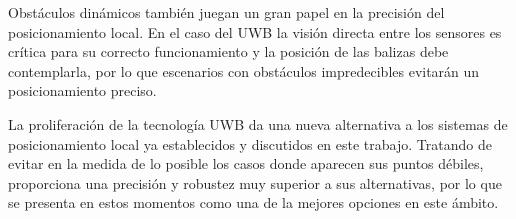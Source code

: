 Obstáculos dinámicos también juegan un gran papel en la precisión del posicionamiento local.
En el caso del UWB la visión directa entre los sensores es crítica para su correcto funcionamiento y la posición de las balizas debe contemplarla, por lo que escenarios con obstáculos impredecibles evitarán un posicionamiento preciso.

La proliferación de la tecnología UWB da una nueva alternativa a los sistemas de posicionamiento local ya establecidos y discutidos en este trabajo.
Tratando de evitar en la medida de lo posible los casos donde aparecen sus puntos débiles, proporciona una precisión y robustez muy superior a sus alternativas, por lo que se presenta en estos momentos como una de la mejores opciones en este ámbito.